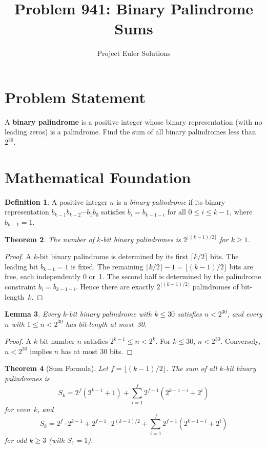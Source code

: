 \documentclass[11pt]{article}
\title{Problem 941: Binary Palindrome Sums}
\author{Project Euler Solutions}
\date{}
\newtheorem{theorem}{Theorem}
\newtheorem{lemma}[theorem]{Lemma}
\theoremstyle{definition}
\newtheorem{definition}[theorem]{Definition}
\begin{document}
\maketitle

\section{Problem Statement}

A \textbf{binary palindrome} is a positive integer whose binary representation (with no leading zeros) is a palindrome. Find the sum of all binary palindromes less than~$2^{30}$.

\section{Mathematical Foundation}

\begin{definition}
A positive integer $n$ is a \emph{binary palindrome} if its binary representation $b_{k-1} b_{k-2} \cdots b_1 b_0$ satisfies $b_i = b_{k-1-i}$ for all $0 \le i \le k-1$, where $b_{k-1}=1$.
\end{definition}

\begin{theorem}
The number of $k$-bit binary palindromes is $2^{\lfloor(k-1)/2\rfloor}$ for $k \ge 1$.
\end{theorem}

\begin{proof}
A $k$-bit binary palindrome is determined by its first $\lceil k/2 \rceil$ bits. The leading bit $b_{k-1}=1$ is fixed. The remaining $\lceil k/2\rceil - 1 = \lfloor(k-1)/2\rfloor$ bits are free, each independently 0 or~1. The second half is determined by the palindrome constraint $b_i = b_{k-1-i}$. Hence there are exactly $2^{\lfloor(k-1)/2\rfloor}$ palindromes of bit-length~$k$.
\end{proof}

\begin{lemma}
Every $k$-bit binary palindrome with $k \le 30$ satisfies $n < 2^{30}$, and every $n$ with $1 \le n < 2^{30}$ has bit-length at most~30.
\end{lemma}

\begin{proof}
A $k$-bit number $n$ satisfies $2^{k-1} \le n < 2^k$. For $k \le 30$, $n < 2^{30}$. Conversely, $n < 2^{30}$ implies $n$ has at most 30 bits.
\end{proof}

\begin{theorem}[Sum Formula]
Let $f = \lfloor(k-1)/2\rfloor$. The sum of all $k$-bit binary palindromes is
\[
S_k = 2^f(2^{k-1}+1) + \sum_{i=1}^{f} 2^{f-1}(2^{k-1-i}+2^i)
\]
for even~$k$, and
\[
S_k = 2^f \cdot 2^{k-1} + 2^{f-1}\cdot 2^{(k-1)/2} + \sum_{i=1}^{f} 2^{f-1}(2^{k-1-i}+2^i)
\]
for odd $k \ge 3$ (with $S_1 = 1$).
\end{theorem}
\end{document}
